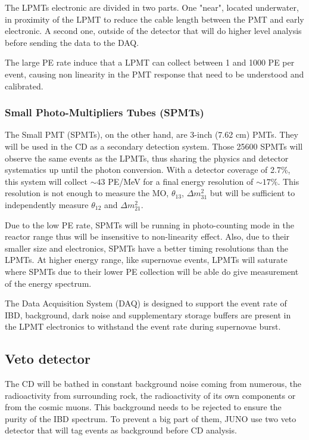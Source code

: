 The LPMTs electronic are divided in two parts. One "near", located underwater, in proximity of the LPMT to reduce the cable length between the PMT and early electronic. A second one, outside of the detector that will do higher level analysis before sending the data to the DAQ.

The large PE rate induce that a LPMT can collect between 1 and 1000 PE per event, causing non linearity in the PMT response that need to be understood and calibrated.

\subsubsection{Small Photo-Multipliers Tubes (SPMTs)}
\label{sec:SPMT}

The Small PMT (SPMTs), on the other hand, are 3-inch (7.62 cm) PMTs. They will be used in the CD as a secondary detection system. Those 25600 SPMTs will observe the same events as the LPMTs, thus sharing the physics and detector systematics up until the photon conversion. With a detector coverage of 2.7\%, this system will collect $\sim 43$ PE/MeV for a final energy resolution of $\sim 17\%$. This resolution is not enough to measure the MO, $\theta_{13}$, $\Delta m^2_{31}$ but will be sufficient to independently measure $\theta_12$ and $\Delta m^2_{21}$.

Due to the low PE rate, SPMTs will be running in photo-counting mode in the reactor range thus will be insensitive to non-linearity effect. Also, due to their smaller size and electronics, SPMTs have a better timing resolutions than the LPMTs.
At higher energy range, like supernovae events, LPMTs will saturate where SPMTs due to their lower PE collection will be able do give measurement of the energy spectrum.

The Data Acquisition System (DAQ) is designed to support the event rate of IBD, background, dark noise and supplementary storage buffers are present in the LPMT electronics to withstand the event rate during supernovae burst.

\subsection{Veto detector}

The CD will be bathed in constant background noise coming from numerous, the radioactivity from surrounding rock, the radioactivity of its own components or from the cosmic muons. This background needs to be rejected to ensure the purity of the IBD spectrum. To prevent a big part of them, JUNO use two veto detector that will tag events as background before CD analysis.

